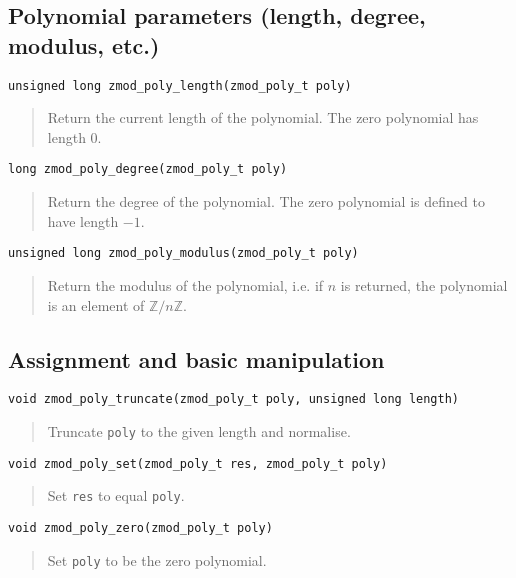 \documentclass[a4paper,10pt]{article}
\newcommand{\Z}{\mathbb{Z}}
\newcommand{\code}{\lstinline}
\begin{document}
\subsection{Polynomial parameters (length, degree, modulus, etc.)}
\begin{lstlisting}
unsigned long zmod_poly_length(zmod_poly_t poly)
\end{lstlisting}
\begin{quote}
Return the current length of the polynomial. The zero polynomial has length 0.
\end{quote}

\begin{lstlisting}
long zmod_poly_degree(zmod_poly_t poly)
\end{lstlisting}
\begin{quote}
Return the degree of the polynomial. The zero polynomial is defined to have length $-1$.
\end{quote}

\begin{lstlisting}
unsigned long zmod_poly_modulus(zmod_poly_t poly)
\end{lstlisting}
\begin{quote}
Return the modulus of the polynomial, i.e. if $n$ is returned, the polynomial is an element of $\Z/n\Z$.\end{quote}

\subsection{Assignment and basic manipulation}
\begin{lstlisting}
void zmod_poly_truncate(zmod_poly_t poly, unsigned long length)
\end{lstlisting}
\begin{quote}
Truncate \code{poly} to the given length and normalise.
\end{quote}

\begin{lstlisting}
void zmod_poly_set(zmod_poly_t res, zmod_poly_t poly)
\end{lstlisting}
\begin{quote}
Set \code{res} to equal \code{poly}.
\end{quote}

\begin{lstlisting}
void zmod_poly_zero(zmod_poly_t poly)
\end{lstlisting}
\begin{quote}
Set \code{poly} to be the zero polynomial.
\end{quote}
\end{document}

